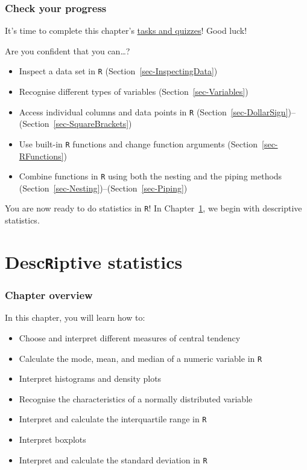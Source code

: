 \documentclass[
  letterpaper,
  DIV=11,
  numbers=noendperiod]{scrreprt}
\providecommand{\tightlist}{%
  \setlength{\itemsep}{0pt}\setlength{\parskip}{0pt}}
\begin{document}
\subsection*{Check your progress}\label{check-your-progress-13}

It's time to complete this chapter's
\href{https://elenlefoll.github.io/RstatsTextbook/quizzes/7_quiz.html}{tasks
and quizzes}! Good luck! 

Are you confident that you can\ldots?

\begin{itemize}
\tightlist
\item[$\square$]
  Inspect a data set in \texttt{R} (Section~\ref{sec-InspectingData})
\item[$\square$]
  Recognise different types of variables (Section~\ref{sec-Variables})
\item[$\square$]
  Access individual columns and data points in \texttt{R}
  (Section~\ref{sec-DollarSign})--(Section~\ref{sec-SquareBrackets})
\item[$\square$]
  Use built-in \texttt{R} functions and change function arguments
  (Section~\ref{sec-RFunctions})
\item[$\square$]
  Combine functions in \texttt{R} using both the nesting and the piping
  methods (Section~\ref{sec-Nesting})--(Section~\ref{sec-Piping})
\end{itemize}

You are now ready to do statistics in \texttt{R}!  In
Chapter~\ref{sec-DescRiptiveStats}, we begin with descriptive
statistics.


\chapter{\texorpdfstring{Desc\texttt{R}iptive
statistics}{DescRiptive statistics}}\label{sec-DescRiptiveStats}

\subsection*{Chapter overview}\label{chapter-overview-7}

In this chapter, you will learn how to:

\begin{itemize}
\tightlist
\item
  Choose and interpret different measures of central tendency
\item
  Calculate the mode, mean, and median of a numeric variable in
  \texttt{R}
\item
  Interpret histograms and density plots
\item
  Recognise the characteristics of a normally distributed variable
\item
  Interpret and calculate the interquartile range in \texttt{R}
\item
  Interpret boxplots
\item
  Interpret and calculate the standard deviation in \texttt{R}
\end{itemize}
\end{document}
